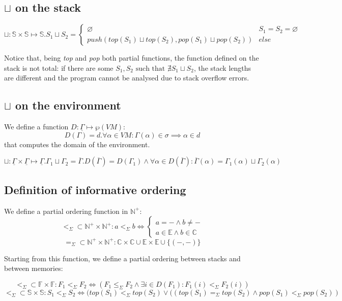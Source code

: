 \documentclass{amsart}
\newcommand{\N}{\mathbb{N}}
\newcommand{\E}{\mathbb{E}}
\newcommand{\C}{\mathbb{C}}
\newcommand{\bF}{\mathbb{F}}
\newcommand{\bS}{\mathbb{S}}
\newcommand{\Int}{\N^+}
\newcommand{\Gset}{\underline{\Gamma}}
\newcommand{\eqs}{=_\Sigma}
\newcommand{\less}{<_\Sigma}
\newcommand{\leqs}{\leq_\Sigma}
\renewcommand{\emptyset}{\varnothing}
\numberwithin{equation}{section}
\theoremstyle{plain} %
\theoremstyle{definition}
\theoremstyle{remark}
\begin{document}
\subsection{$\sqcup$ on the stack}
\[
\sqcup: \bS{} \times \bS{} \mapsto \bS{}. S_1 \sqcup S_2 =
\begin{cases}
\emptyset & S_1 = S_2 = \emptyset\\
push(top(S_1) \sqcup top(S_2), pop(S_1) \sqcup pop(S_2)) & else
\end{cases}
\]

Notice that, being \emph{top} and \emph{pop} both partial functions, the function defined on the stack is not total: if there are some $S_1, S_2 \text{ such that } \nexists S_1 \sqcup S_2$, the stack lengths are different and the program cannot be analysed due to stack overflow errors.

\subsection{$\sqcup$ on the environment}
We define a function $D: \Gset{} \mapsto \wp(VM)$:\\
\[D(\Gamma) = d.\forall \alpha \in VM: \Gamma(\alpha) \in \sigma \implies \alpha \in d\]
that computes the domain of the environment.

\[
\sqcup: \Gset{} \times \Gset{} \mapsto \Gset{}. \Gamma_1 \sqcup \Gamma_2 = \overline{\Gamma}. D(\overline{\Gamma}) = D(\Gamma_1) \wedge \forall \alpha \in D(\overline{\Gamma}): \overline{\Gamma}(\alpha) = \Gamma_1(\alpha) \sqcup \Gamma_2(\alpha)
\]

\subsection{Definition of informative ordering}

We define a partial ordering function in $\Int{}$:
\[\less{} \subset \Int{} \times \Int{}: a \less{} b \iff
\begin{cases}
a = - \wedge b \neq -\\
a \in \E{} \wedge b \in \C{}
\end{cases}\]
\[\eqs{} \subset \Int{} \times \Int{}: \C{} \times \C{} \cup \E{} \times \E{} \cup \{(-, -)\}\]

Starting from this function, we define a partial ordering between stacks and between memories:

\[\less{} \subset \bF{} \times \bF{}: F_1 \less F_2 \iff (F_1 \leqs F_2 \wedge \exists i \in D(F_1): F_1(i) \less F_2(i))\]
\[\less \subset \bS{} \times \bS{}: S_1 \less S_2 \iff (top(S_1) \less top(S_2) \vee ((top(S_1) \eqs top(S_2) \wedge pop(S_1) \less pop(S_2))\]
\end{document}
